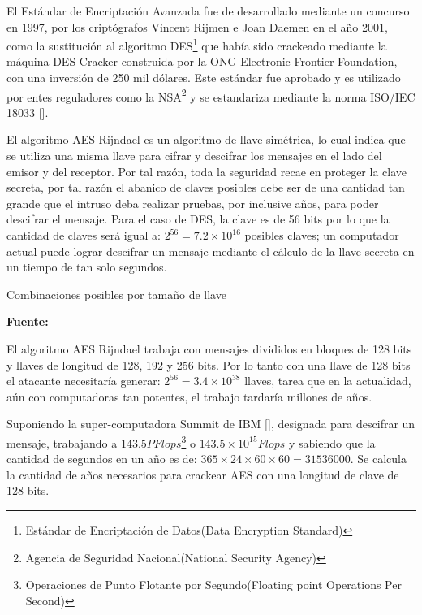 \documentclass[../main/main.tex]{subfiles}
\begin{document}
  El Estándar de Encriptación Avanzada fue de desarrollado mediante un concurso en 1997, por los criptógrafos Vincent Rijmen e Joan Daemen en el año 2001, como la sustitución al algoritmo DES\footnote{Estándar de Encriptación de Datos(Data Encryption Standard)} que había sido crackeado mediante la máquina DES Cracker construida por la ONG Electronic Frontier Foundation, con una inversión de 250 mil dólares. Este estándar fue aprobado y es utilizado por entes reguladores como la NSA\footnote{Agencia de Seguridad Nacional(National Security Agency)} y se estandariza mediante la norma ISO/IEC 18033 [\cite{standard:iso_18033}].

  El algoritmo AES Rijndael es un algoritmo de llave simétrica, lo cual indica que se utiliza una misma llave para cifrar y descifrar los mensajes en el lado del emisor y del receptor. Por tal razón, toda la seguridad recae en proteger la clave secreta, por tal razón el abanico de claves posibles debe ser de una cantidad tan grande que el intruso deba realizar pruebas, por inclusive años, para poder descifrar el mensaje. Para el caso de DES, la clave es de 56 bits por lo que la cantidad de claves será igual a: $2^{56} = 7.2 \times 10^{16}$ posibles claves; un computador actual puede lograr descifrar un mensaje mediante el cálculo de la llave secreta en un tiempo de tan solo segundos.

  \begin{table}[H]
    \centering
    \caption{Combinaciones posibles por tamaño de llave}
    
    \caption*{\textbf{Fuente:} \cite{web:secure_mobile_aes_encryption}}
  \end{table}

  El algoritmo AES Rijndael trabaja con mensajes divididos en bloques de 128 bits y llaves de longitud de 128, 192 y 256 bits. Por lo tanto con una llave de 128 bits el atacante necesitaría generar: $2^{56} = 3.4 \times 10^{38}$ llaves, tarea que en la actualidad, aún con computadoras tan potentes, el trabajo tardaría millones de años.

  Suponiendo la super-computadora Summit de IBM [\cite{web:supercomputadora_summit_ibm}], designada para descifrar un mensaje, trabajando a $143.5PFlops$\footnote{Operaciones de Punto Flotante por Segundo(Floating point Operations Per Second)} o $143.5 \times 10^{15} Flops$ y sabiendo que la cantidad de segundos en un año es de: $365 \times 24 \times 60 \times 60 = 31536000$. Se calcula la cantidad de años necesarios para crackear AES con una longitud de clave de 128 bits.
\end{document}
